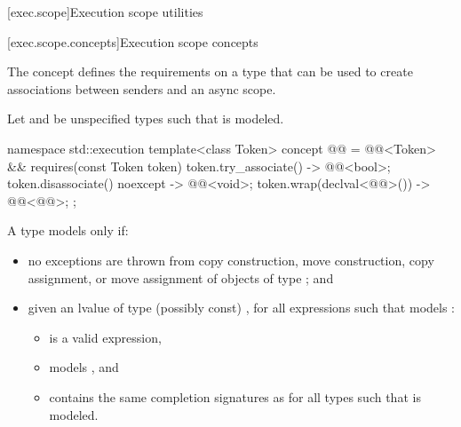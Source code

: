 [exec.scope]{Execution scope utilities}

[exec.scope.concepts]{Execution scope concepts}

\pnum
The  concept defines the requirements on
a type  that can be used to create associations
between senders and an async scope.

\pnum
Let  and 
be unspecified types such that
is modeled.

\begin{codeblock}
namespace std::execution {
  template<class Token>
    concept @@ =
      @@<Token> &&
      requires(const Token token) {
        { token.try_associate() } -> @@<bool>;
        { token.disassociate() } noexcept -> @@<void>;
        { token.wrap(declval<@@>()) } -> @@<@@>;
      };
}
\end{codeblock}

\pnum
A type  models  only if:

\begin{itemize}
\item
no exceptions are thrown from
copy construction,
move construction,
copy assignment, or
move assignment
of objects of type ; and

\item
given an lvalue  of type (possibly const) ,
for all expressions  such that
 models :
  \begin{itemize}
  \item
   is a valid expression,
  \item
   models , and
  \item
  contains the same completion signatures as
  for all types  such that
   is modeled.
  \end{itemize}
\end{itemize}

